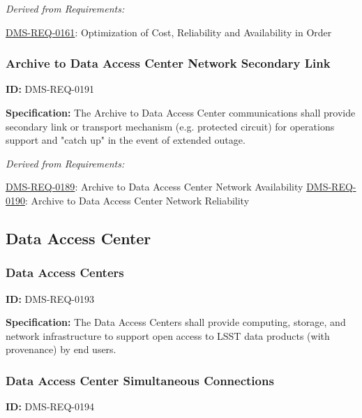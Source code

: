 \documentclass[SE,toc,lsstdraft]{lsstdoc}
\begin{document}
\emph{Derived from Requirements:}

\hyperref[DMS-REQ-0161]{DMS-REQ-0161}:
Optimization of Cost, Reliability and Availability in Order \newline


\subsubsection{Archive to Data Access Center Network Secondary Link}

\label{DMS-REQ-0191}
\textbf{ID:} DMS-REQ-0191

\textbf{Specification: }The Archive to Data Access Center communications shall provide secondary link or transport mechanism (e.g. protected circuit) for operations support and "catch up" in the event of extended outage.






\emph{Derived from Requirements:}

\hyperref[DMS-REQ-0189]{DMS-REQ-0189}:
Archive to Data Access Center Network Availability \newline
\hyperref[DMS-REQ-0190]{DMS-REQ-0190}:
Archive to Data Access Center Network Reliability \newline


\subsection{Data Access Center}





\subsubsection{Data Access Centers}

\label{DMS-REQ-0193}
\textbf{ID:} DMS-REQ-0193

\textbf{Specification:} The Data Access Centers shall provide computing, storage, and network infrastructure to support open access to LSST data products (with provenance) by end users.






\subsubsection{Data Access Center Simultaneous Connections}

\label{DMS-REQ-0194}
\textbf{ID:} DMS-REQ-0194
\end{document}
